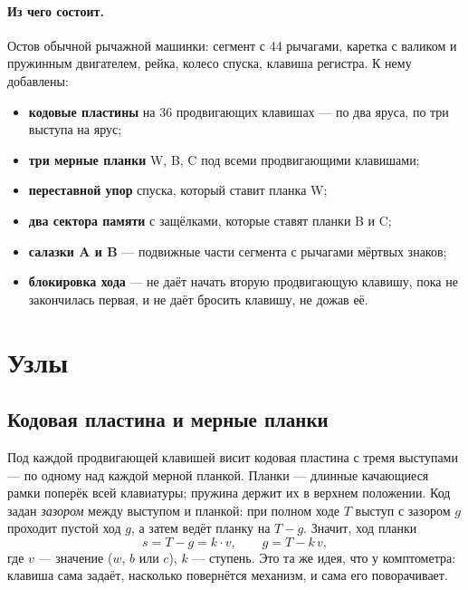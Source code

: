 \paragraph{Из чего состоит.} Остов обычной рычажной машинки: сегмент с 44 рычагами, каретка с валиком и пружинным двигателем, рейка, колесо спуска, клавиша регистра. К нему добавлены:
\begin{itemize}
  \item \textbf{кодовые пластины} на 36 продвигающих клавишах — по два яруса, по три выступа на ярус;
  \item \textbf{три мерные планки} W, B, C под всеми продвигающими клавишами;
  \item \textbf{переставной упор} спуска, который ставит планка W;
  \item \textbf{два сектора памяти} с защёлками, которые ставят планки B и C;
  \item \textbf{салазки A и B} — подвижные части сегмента с рычагами мёртвых знаков;
  \item \textbf{блокировка хода} — не даёт начать вторую продвигающую клавишу, пока не закончилась первая, и не даёт бросить клавишу, не дожав её.
\end{itemize}

\section{Узлы}

\subsection{Кодовая пластина и мерные планки}

Под каждой продвигающей клавишей висит кодовая пластина с тремя выступами — по одному над каждой мерной планкой. Планки — длинные качающиеся рамки поперёк всей клавиатуры; пружина держит их в верхнем положении. Код задан \emph{зазором} между выступом и планкой: при полном ходе $T$ выступ с зазором $g$ проходит пустой ход $g$, а затем ведёт планку на $T - g$. Значит, ход планки
\[
  s = T - g = k \cdot v, \qquad g = T - k\,v,
\]
где $v$ — значение ($w$, $b$ или $c$), $k$ — ступень. Это та же идея, что у комптометра: клавиша сама задаёт, насколько повернётся механизм, и сама его поворачивает.

